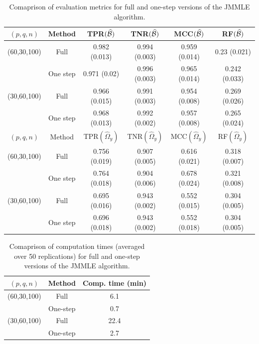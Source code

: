 \begin{table}[t!]
\centering
    \begin{tabular}{cccccc}
    \hline
    $(p,q,n)$     & Method         & TPR$(\widehat {{\cal{B}}})$            & TNR$(\widehat {{\cal{B}}})$            & MCC$(\widehat {{\cal{B}}})$ & RF$(\widehat {{\cal{B}}})$             \\\hline
    (60,30,100) & Full         & 0.982 (0.013) & 0.994 (0.003) & 0.959 (0.014)   & 0.23 (0.021)  \\
    ~           & One step     & 0.971 (0.02)  & 0.996 (0.003) & 0.965 (0.014)   & 0.242 (0.033) \\
    (30,60,100) & Full         & 0.966 (0.015) & 0.991 (0.003) & 0.954 (0.008)   & 0.269 (0.026) \\
    ~           & One step     & 0.968 (0.013) & 0.992 (0.002) & 0.957 (0.008)   & 0.265 (0.024) \\ \hline
    \hline
    $(p,q,n)$     & Method         & TPR$(\widehat \Omega_y)$            & TNR$(\widehat \Omega_y)$            & MCC$(\widehat \Omega_y)$ & RF$(\widehat \Omega_y)$            \\\hline
    (60,30,100) & Full         & 0.756 (0.019) & 0.907 (0.005)  & 0.616 (0.021)   & 0.318 (0.007) \\
    ~           & One step     & 0.764 (0.018) & 0.904 (0.006)  & 0.678 (0.024)   & 0.321 (0.008) \\
    (30,60,100) & Full         & 0.695 (0.016) & 0.943 (0.002)  & 0.552 (0.015)   & 0.304 (0.005) \\
    ~           & One step     & 0.696 (0.018) & 0.943 (0.002)  & 0.552 (0.018)   & 0.304 (0.005) \\\hline
    \end{tabular}
    \caption{Comaprison of evaluation metrics for full and one-step versions of the JMMLE algorithm.}
    \label{table:simtable41}
\end{table}
%
\begin{table}[t!]
\centering
  \begin{tabular}{ccc}
    \hline
    $(p,q,n)$     & Method   & Comp. time (min) \\ \hline
    (60,30,100) & Full     & 6.1              \\ 
    ~           & One-step & 0.7              \\ \hline
    (30,60,100) & Full     & 22.4             \\ 
    ~           & One-step & 2.7              \\ \hline
    \end{tabular}
    \caption{Comaprison of computation times (averaged over 50 replications) for full and one-step versions of the JMMLE algorithm.}
    \label{table:simtable42}
\end{table}


